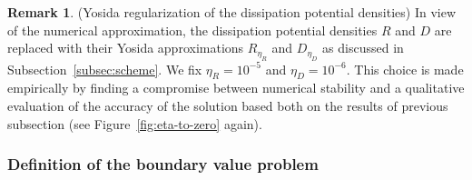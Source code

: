 \documentclass[a4paper,10pt,twoside]{amsbook}
\numberwithin{section}{chapter}
\numberwithin{equation}{chapter}
\theoremstyle{definition}
\newtheorem{rmk}[prop]{Remark}
\begin{document}
\begin{rmk}(Yosida regularization of the dissipation potential densities)
In view of the numerical approximation, the dissipation potential densities $R$ and $D$ are replaced with their Yosida approximations $R_{\eta_R}$ and $D_{\eta_D}$ as discussed in Subsection~\ref{subsec:scheme}. We fix $\eta_R=10^{-5}$ and $\eta_D=10^{-6}$. This choice is made empirically by finding a compromise between numerical stability and a qualitative evaluation of the accuracy of the solution based both on the results of previous subsection (see Figure~\ref{fig:eta-to-zero} again).
\end{rmk}

\subsubsection*{Definition of the boundary value problem}
\end{document}
